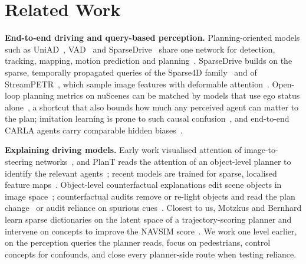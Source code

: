 \documentclass[journal]{IEEEtran}
\begin{document}
\section{Related Work}
\textbf{End-to-end driving and query-based perception.} Planning-oriented models such as UniAD~\cite{hu2023uniad},
VAD~\cite{jiang2023vad} and SparseDrive~\cite{sun2024sparsedrive} share one network for detection, tracking, mapping,
motion prediction and planning~\cite{chen2024e2esurvey}. SparseDrive builds on the sparse, temporally propagated
queries of the Sparse4D family~\cite{lin2022sparse4d,lin2023sparse4dv3} and of StreamPETR~\cite{wang2023streampetr},
which sample image features with deformable attention~\cite{zhu2021deformable}. Open-loop planning metrics on nuScenes
can be matched by models that use ego status alone~\cite{zhai2023admlp,li2024egostatus}, a shortcut that also bounds
how much any perceived agent can matter to the plan; imitation learning is prone to such causal
confusion~\cite{dehaan2019causalconfusion,codevilla2019limitations}, and end-to-end CARLA agents carry comparable hidden
biases~\cite{jaeger2023hiddenbiases}.

\textbf{Explaining driving models.} Early work visualised attention of image-to-steering
networks~\cite{kim2017causalattention}, and PlanT reads the attention of an object-level planner to identify the relevant
agents~\cite{renz2022plant}; recent models are trained for sparse, localised feature
maps~\cite{mirzaie2025interpretable}. Object-level counterfactual explanations edit
scene objects in image space~\cite{jacob2022steex,zemni2023octet}; counterfactual audits remove or re-light objects and
read the plan change~\cite{yang2026beyondleaderboard,cvaa2026} or audit reliance on spurious cues~\cite{cadet2026}. Closest to us,
Motzkus and Bernhard learn sparse dictionaries on the latent space of a trajectory-scoring planner and intervene on
concepts to improve the NAVSIM score~\cite{motzkus2026drivingwrongway}. We work one level earlier, on the perception
queries the planner reads, focus on pedestrians, control concepts for confounds, and close every planner-side route
when testing reliance.
\end{document}
